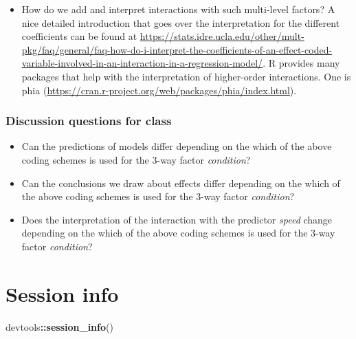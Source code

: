 \documentclass[
]{article}
\newenvironment{Shaded}{\begin{snugshade}}{\end{snugshade}}
\newcommand{\KeywordTok}[1]{\textcolor[rgb]{0.13,0.29,0.53}{\textbf{#1}}}
\newcommand{\NormalTok}[1]{#1}
\newcommand{\OperatorTok}[1]{\textcolor[rgb]{0.81,0.36,0.00}{\textbf{#1}}}
\providecommand{\tightlist}{%
  \setlength{\itemsep}{0pt}\setlength{\parskip}{0pt}}
\begin{document}
\normalsize

\begin{itemize}
\tightlist
\item
  How do we add and interpret interactions with such multi-level
  factors? A nice detailed introduction that goes over the
  interpretation for the different coefficients can be found at
  \url{https://stats.idre.ucla.edu/other/mult-pkg/faq/general/faq-how-do-i-interpret-the-coefficients-of-an-effect-coded-variable-involved-in-an-interaction-in-a-regression-model/}.
  R provides many packages that help with the interpretation of
  higher-order interactions. One is phia
  (\url{https://cran.r-project.org/web/packages/phia/index.html}).
\end{itemize}

\hypertarget{discussion-questions-for-class-4}{%
\subsubsection{Discussion questions for
class}\label{discussion-questions-for-class-4}}

\begin{itemize}
\tightlist
\item
  Can the predictions of models differ depending on the which of the
  above coding schemes is used for the 3-way factor \emph{condition}?
\item
  Can the conclusions we draw about effects differ depending on the
  which of the above coding schemes is used for the 3-way factor
  \emph{condition}?
\item
  Does the interpretation of the interaction with the predictor
  \emph{speed} change depending on the which of the above coding schemes
  is used for the 3-way factor \emph{condition}?
\end{itemize}

\hypertarget{session-info}{%
\section{Session info}\label{session-info}}

\footnotesize

\begin{Shaded}
\begin{Highlighting}[]
\NormalTok{devtools}\OperatorTok{::}\KeywordTok{session_info}\NormalTok{()}
\end{Highlighting}
\end{Shaded}
\end{document}
